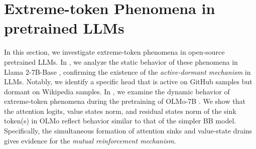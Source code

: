 \section{Extreme-token Phenomena in pretrained LLMs} \label{sec:llm}


In this section, we investigate extreme-token phenomena in open-source pretrained LLMs. In , we analyze the static behavior of these phenomena in Llama 2-7B-Base \citep{touvron2023llama}, confirming the existence of the \textit{active-dormant mechanism} in LLMs. Notably, we identify a specific head that is active on GitHub samples but dormant on Wikipedia samples. In , we examine the dynamic behavior of extreme-token phenomena during the pretraining of OLMo-7B \citep{groeneveld2024olmo}. We show that the attention logits, value states norm, and residual states norm of the sink token(s) in OLMo reflect behavior similar to that of the simpler BB model. Specifically, the simultaneous formation of attention sinks and value-state drains gives evidence for the \textit{mutual reinforcement mechanism}.


